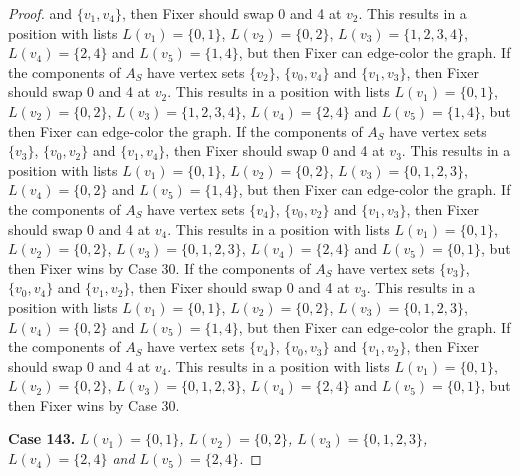 \documentclass[12pt]{amsart}
\theoremstyle{plain}
\theoremstyle{definition}
\theoremstyle{remark}
\begin{document}
\begin{proof}
and $\{v_1, v_4\}$, then Fixer should swap 0 and 4 at $v_2$. This results in a position with lists $L(v_1) = \{0, 1\}$, $L(v_2) = \{0, 2\}$, $L(v_3) = \{1, 2, 3, 4\}$, $L(v_4) = \{2, 4\}$ and $L(v_5) = \{1, 4\}$, but then Fixer can edge-color the graph. If the components of $A_S$ have vertex sets $\{v_2\}$, $\{v_0, v_4\}$ and $\{v_1, v_3\}$, then Fixer should swap 0 and 4 at $v_2$. This results in a position with lists $L(v_1) = \{0, 1\}$, $L(v_2) = \{0, 2\}$, $L(v_3) = \{1, 2, 3, 4\}$, $L(v_4) = \{2, 4\}$ and $L(v_5) = \{1, 4\}$, but then Fixer can edge-color the graph. If the components of $A_S$ have vertex sets $\{v_3\}$, $\{v_0, v_2\}$ and $\{v_1, v_4\}$, then Fixer should swap 0 and 4 at $v_3$. This results in a position with lists $L(v_1) = \{0, 1\}$, $L(v_2) = \{0, 2\}$, $L(v_3) = \{0, 1, 2, 3\}$, $L(v_4) = \{0, 2\}$ and $L(v_5) = \{1, 4\}$, but then Fixer can edge-color the graph. If the components of $A_S$ have vertex sets $\{v_4\}$, $\{v_0, v_2\}$ and $\{v_1, v_3\}$, then Fixer should swap 0 and 4 at $v_4$. This results in a position with lists $L(v_1) = \{0, 1\}$, $L(v_2) = \{0, 2\}$, $L(v_3) = \{0, 1, 2, 3\}$, $L(v_4) = \{2, 4\}$ and $L(v_5) = \{0, 1\}$, but then Fixer wins by Case 30. If the components of $A_S$ have vertex sets $\{v_3\}$, $\{v_0, v_4\}$ and $\{v_1, v_2\}$, then Fixer should swap 0 and 4 at $v_3$. This results in a position with lists $L(v_1) = \{0, 1\}$, $L(v_2) = \{0, 2\}$, $L(v_3) = \{0, 1, 2, 3\}$, $L(v_4) = \{0, 2\}$ and $L(v_5) = \{1, 4\}$, but then Fixer can edge-color the graph. If the components of $A_S$ have vertex sets $\{v_4\}$, $\{v_0, v_3\}$ and $\{v_1, v_2\}$, then Fixer should swap 0 and 4 at $v_4$. This results in a position with lists $L(v_1) = \{0, 1\}$, $L(v_2) = \{0, 2\}$, $L(v_3) = \{0, 1, 2, 3\}$, $L(v_4) = \{2, 4\}$ and $L(v_5) = \{0, 1\}$, but then Fixer wins by Case 30. 

\noindent\textbf{Case 143.  }\textit{$L(v_1) = \{0, 1\}$, $L(v_2) = \{0, 2\}$, $L(v_3) = \{0, 1, 2, 3\}$, $L(v_4) = \{2, 4\}$ and $L(v_5) = \{2, 4\}$.}


\end{proof}
\end{document}
